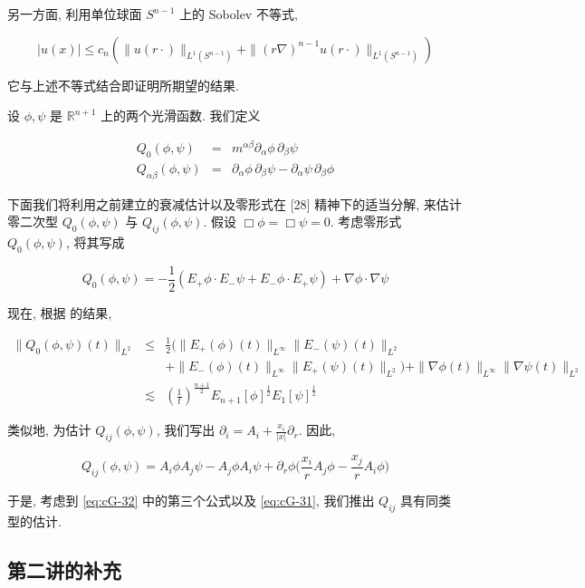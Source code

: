 另一方面, 利用单位球面 $S^{n - 1}$ 上的 Sobolev 不等式, 

\[
|u(x)| \leq c_{n}\left(\|u(r\cdot)\|_{L^{1}\left(S^{n - 1}\right)} + \|(r\nabla)^{n - 1}u(r\cdot)\|_{L^{1}\left(S^{n - 1}\right)}\right)
\]

它与上述不等式结合即证明所期望的结果. 

\begin{definition}\label{def:cG-4.17}
设 $\phi,  \psi$ 是 $\mathbb{R}^{n+1}$ 上的两个光滑函数. 我们定义

\[
\begin{array}{rcl}
Q_{0}(\phi,  \psi) & = & m^{\alpha\beta}\partial_{\alpha}\phi\, \partial_{\beta}\psi \\
Q_{\alpha\beta}(\phi,  \psi) & = & \partial_{\alpha}\phi\, \partial_{\beta}\psi - \partial_{\alpha}\psi\, \partial_{\beta}\phi
\end{array}
\]
\end{definition}

下面我们将利用之前建立的衰减估计以及零形式在 {[}28{]} 精神下的适当分解, 来估计零二次型 $Q_{0}(\phi, \psi)$ 与 $Q_{ij}(\phi, \psi)$. 假设 $\Box\phi=\Box\psi=0$. 考虑零形式 $Q_{0}(\phi, \psi)$, 将其写成

\[
Q_{0}(\phi,  \psi) = -\frac{1}{2}(E_{+}\phi\cdot E_{-}\psi + E_{-}\phi\cdot E_{+}\psi) + \nabla\phi\cdot\nabla\psi
\]

现在, 根据  的结果, 

\[
\begin{array}{rcl}
\|Q_{0}(\phi,  \psi)(t)\|_{L^{2}} & \leq & \frac{1}{2}\bigg(\|E_{+}(\phi)(t)\|_{L^{\infty}}\|E_{-}(\psi)(t)\|_{L^{2}} \\
& & + \|E_{-}(\phi)(t)\|_{L^{\infty}}\|E_{+}(\psi)(t)\|_{L^{2}}\bigg) + \|\nabla\phi(t)\|_{L^{\infty}}\|\nabla\psi(t)\|_{L^{2}} \\
& \lesssim & \left(\frac{1}{t}\right)^{\frac{n + 1}{2}}E_{n + 1}[\phi]^{\frac{1}{2}}E_{1}[\psi]^{\frac{1}{2}}
\end{array}
\]

类似地, 为估计 $Q_{ij}(\phi , \psi)$, 我们写出 $\partial_i = A_i + \frac{x_i}{|x|}\partial_r$. 因此, 

\[
Q_{ij}(\phi,  \psi) = A_{i}\phi A_{j}\psi - A_{j}\phi A_{i}\psi + \partial_{r}\phi\Big(\frac{x_{i}}{r}A_{j}\phi - \frac{x_{j}}{r}A_{i}\phi\Big)
\]

于是, 考虑到 \eqref{eq:cG-32} 中的第三个公式以及 \eqref{eq:cG-31}, 我们推出 $Q_{ij}$ 具有同类型的估计. 
\subsection{第二讲的补充}

